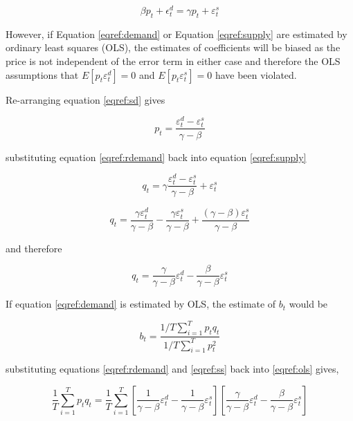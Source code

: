 \documentclass[12pt, a4paper, oneside]{article}\usepackage[]{graphicx}\usepackage[]{color}
\begin{document}
\begin{equation}
\label{eqref:sd}
\beta p_t + \epsilon_t^d=\gamma p_t+\varepsilon_t^s
\end{equation}

However, if Equation \ref{eqref:demand} or Equation \ref{eqref:supply} are estimated by ordinary least squares (OLS), the estimates of coefficients will be biased as the price is not independent of the error term in either case and therefore the OLS assumptions that $E[p_t\varepsilon_t^d] = 0$ and $E[p_t\varepsilon_t^s] = 0$ have been violated.    

Re-arranging equation \ref{eqref:sd} gives

\begin{equation}
\label{eqref:rdemand}
p_t = \frac{\varepsilon_t^d - \varepsilon_t^s}{\gamma-\beta}
\end{equation}

substituting equation \ref{eqref:rdemand} back into equation \ref{eqref:supply}

\begin{equation}
\label{eqref:ds}
q_t=\gamma \frac{\varepsilon_t^d - \varepsilon_t^s}{\gamma - \beta}+\varepsilon_t^s
\end{equation}

\begin{equation}
q_t=\frac{\gamma \varepsilon_t^d}{\gamma-\beta}-\frac{\gamma \varepsilon_t^s}{\gamma - \beta} + \frac{(\gamma-\beta) \varepsilon_t^s}{\gamma - \beta}
\end{equation}

and therefore

\begin{equation}
\label{eqref:ss}
q_t=\frac{\gamma}{\gamma - \beta} \varepsilon_t^d - \frac{\beta}{\gamma - \beta} \varepsilon_t^s
\end{equation}

If equation \ref{eqref:demand} is estimated by OLS, the estimate of $b_t$ would be 

\begin{equation}
\label{eqref:ols}
b_t=\frac{1/T \sum_{i=1}^{T} p_t q_t}{1/T \sum_{i=1}^{T} p_t^2}
\end{equation}

substituting equations \ref{eqref:rdemand} and \ref{eqref:ss} back into \ref{eqref:ols} gives, 

\begin{equation}
\frac{1}{T} \sum_{i=1}^{T} p_t q_t = \frac{1}{T} \sum_{i=1}^{T} \left [ \frac{1}{\gamma - \beta} \varepsilon_t^d - \frac{1}{\gamma - \beta} \varepsilon_t^s  \right ]  \left [ \frac{\gamma}{\gamma - \beta} \varepsilon_t^d - \frac{\beta}{\gamma - \beta} \varepsilon_t^s \right ] 
\end{equation}
\end{document}
